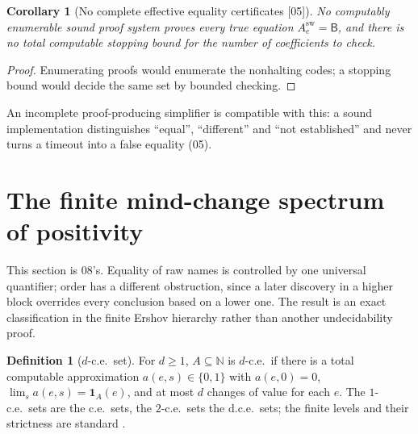 \documentclass[11pt,oneside]{article}
\numberwithin{equation}{section}
\newtheorem{corollary}[corollary]{Corollary}
\theoremstyle{definition}
\newtheorem{definition}[definition]{Definition}
\theoremstyle{remark}
\newcommand{\N}{\mathbb N}
\newcommand{\sB}{\mathsf B}
\newcommand{\src}[1]{\textup{\textsf{\small[#1]}}}
\begin{document}
\begin{corollary}[No complete effective equality certificates \src{05}]\label{onot:neg:cor:proofobstruction}
No computably enumerable sound proof system proves every true equation
$A^{\mathrm{sw}}_e=\sB$, and there is no total computable stopping bound for the
number of coefficients to check.
\end{corollary}
\begin{proof}
Enumerating proofs would enumerate the nonhalting codes; a stopping bound would
decide the same set by bounded checking.
\end{proof}
An incomplete proof-producing simplifier is compatible with this: a sound
implementation distinguishes ``equal'', ``different'' and ``not established'' and
never turns a timeout into a false equality (05).

\section{The finite mind-change spectrum of positivity}\label{onot:neg:sec:ershov}

This section is 08's. Equality of raw names is controlled by one universal
quantifier; order has a different obstruction, since a later discovery in a higher
block overrides every conclusion based on a lower one. The result is an exact
classification in the finite Ershov hierarchy rather than another undecidability
proof.

\begin{definition}[$d$-c.e.\ set]\label{onot:neg:def:dce}
For $d\ge1$, $A\subseteq\N$ is $d$-c.e.\ if there is a total computable
approximation $a(e,s)\in\{0,1\}$ with $a(e,0)=0$, $\lim_sa(e,s)=\mathbf 1_A(e)$, and
at most $d$ changes of value for each $e$. The $1$-c.e.\ sets are the c.e.\ sets,
the $2$-c.e.\ sets the d.c.e.\ sets; the finite levels and their strictness are
standard \cite{Ershov}.
\end{definition}
\end{document}
